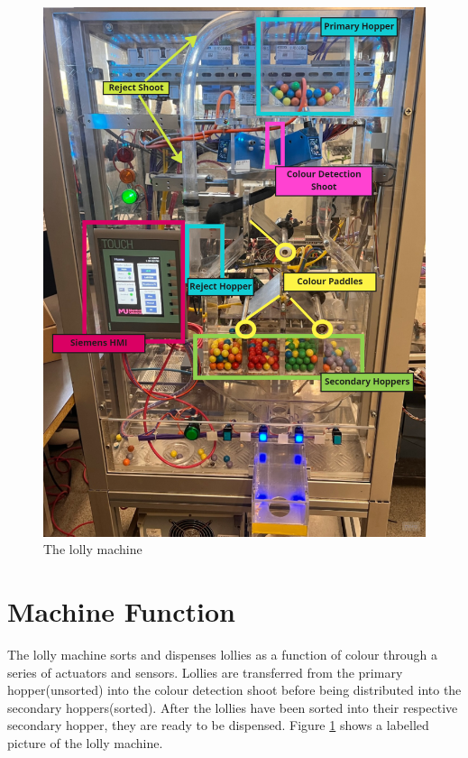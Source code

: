     \begin{figure}[ht]
        \centering
        \includegraphics[scale = 0.5]{2_images/lollyMachine}
        \caption{The lolly machine}
        \label{fig:lollyMachine}
    \end{figure}

\section{Machine Function}
    The lolly machine sorts and dispenses lollies as a function of colour through a series of actuators and sensors. Lollies are transferred from the primary hopper(unsorted) into the colour detection shoot before being distributed into the secondary hoppers(sorted). After the lollies have been sorted into their respective secondary hopper, they are ready to be dispensed. Figure \ref{fig:lollyMachine} shows a labelled picture of the lolly machine. 

